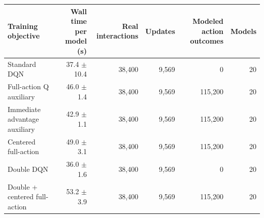 \begin{tabular}{lrrrrr}
\toprule
Training objective & Wall time per model (s) & Real interactions & Updates & Modeled action outcomes & Models \\
\midrule
Standard DQN & 37.4 $\pm$ 10.4 & 38,400 & 9,569 & 0 & 20 \\
Full-action Q auxiliary & 46.0 $\pm$ 1.4 & 38,400 & 9,569 & 115,200 & 20 \\
Immediate advantage auxiliary & 42.9 $\pm$ 1.1 & 38,400 & 9,569 & 115,200 & 20 \\
Centered full-action & 49.0 $\pm$ 3.1 & 38,400 & 9,569 & 115,200 & 20 \\
Double DQN & 36.0 $\pm$ 1.6 & 38,400 & 9,569 & 0 & 20 \\
Double + centered full-action & 53.2 $\pm$ 3.9 & 38,400 & 9,569 & 115,200 & 20 \\
\bottomrule
\end{tabular}
